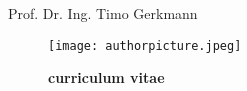 \newpage

\pagestyle{empty}

\sffamily 
\begin{LARGE}
Prof. Dr. Ing. Timo Gerkmann
\end{LARGE}
\normalfont


\begin{figure}[h!]
\begin{minipage}[h!]{0.23\textwidth}
		\centering
			\texttt{[image: authorpicture.jpeg]}
		\end{minipage}
\hspace{0.3 cm}
\begin{minipage}[h!]{0.7\textwidth}
\vspace{5mm}
\textbf{curriculum vitae} \\
 \end{minipage}
\end{figure}



